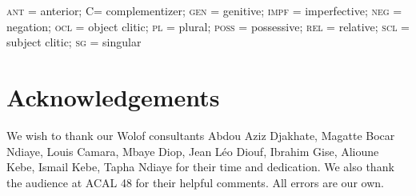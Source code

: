 \documentclass[output=paper
,modfonts
,nonflat]{langsci/langscibook}
\begin{document}
\textsc{ant} = anterior; C= complementizer; \textsc{gen} = genitive; \textsc{impf} = imperfective; \textsc{neg} =
negation; \textsc{ocl} = object clitic; \textsc{pl} = plural; \textsc{poss} = possessive;
\textsc{rel} = relative; \textsc{scl} = subject clitic; \textsc{sg} = singular


\section*{Acknowledgements}

We wish to thank our Wolof consultants Abdou Aziz Djakhate, Magatte Bocar Ndiaye, Louis Camara, Mbaye
Diop, Jean L\'eo Diouf, Ibrahim Gise,  Alioune Kebe, Ismail Kebe,
Tapha Ndiaye for their time and dedication. We also thank the audience
at ACAL 48 for their helpful comments. All errors are our own.  

\printbibliography[heading=subbibliography,notkeyword=this]
\end{document}
